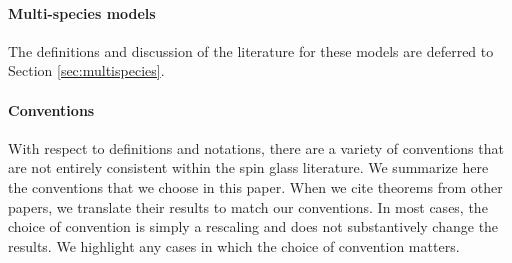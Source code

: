 \documentclass[11pt]{article}
\numberwithin{equation}{section}
\theoremstyle{remark}
\begin{document}
\paragraph{Multi-species models} The definitions and discussion of the literature for these models are deferred to Section \ref{sec:multispecies}.

\paragraph{Conventions}
With respect to definitions and notations, there are a variety of conventions that are not entirely consistent within the spin glass literature.  We summarize here the conventions that we choose in this paper.  When we cite theorems from other papers, we translate their results to match our conventions.  In most cases, the choice of convention is simply a rescaling and does not substantively change the results. We highlight any cases in which the choice of convention matters.
\end{document}
